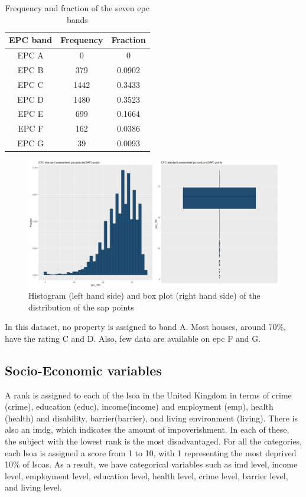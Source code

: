 \documentclass[12pt]{article}
\begin{document}
\begin{table}[H]
\centering
\begin{tabular}{c c c} 
 \hline
 EPC band & Frequency & Fraction \\ [0.5ex] 
 \hline
 EPC A & 0 & 0 \\ 
 EPC B & 379 & 0.0902\\
 EPC C & 1442 & 0.3433 \\
 EPC D & 1480 & 0.3523 \\
 EPC E & 699 & 0.1664 \\
 EPC F & 162 & 0.0386 \\
 EPC G & 39 & 0.0093 \\ [1ex] 
 \hline
\end{tabular}
\caption{Frequency and fraction of the seven \acrshort{epc} bands}
\label{table:EPC}
\end{table}


\begin{figure}[H]
    \centering
    \includegraphics[width=17cm]{epc.png}
    \caption{Histogram (left hand side) and box plot (right hand side) of the distribution of the \acrshort{sap} points}
    \label{fig:EPCs}
\end{figure}

In this dataset, no property is assigned to band A. Most houses, around 70\%, have the rating C and D. Also, few data are available on \acrshort{epc} F and G. 

\subsection{Socio-Economic variables}
A rank is assigned to each of the \acrfull{lsoa} in the United Kingdom in terms of crime (\gls{crime}), education (\gls{educ}), income(\gls{income}) and employment (\gls{emp}), health (\gls{health}) and disability, barrier(\gls{barrier}), and living environment (\gls{living}). There is also an \gls{imdg}, which indicates the amount of impoverishment. In each of these, the subject with the lowest rank is the most disadvantaged. For all the categories, each \acrshort{lsoa} is assigned a score from 1 to 10, with 1 representing the most deprived 10\% of \acrshort{lsoa}s. As a result, we have categorical variables such as imd level, income level, employment level, education level, health level, crime level, barrier level, and living level.
\end{document}
